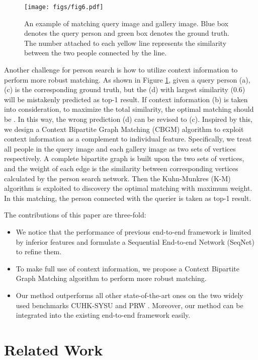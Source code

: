 \documentclass[letterpaper]{article} \usepackage{aaai21}  \usepackage{times}  \usepackage{helvet} \usepackage{courier}  \usepackage[hyphens]{url}  \usepackage{graphicx} \urlstyle{rm} \def\UrlFont{\rm}  \usepackage{natbib}  \usepackage{caption} \usepackage{multirow}
\begin{document}
\begin{figure}[t]
    \centering
    \texttt{[image: figs/fig6.pdf]}
    \caption{An example of matching query image and gallery image. Blue box denotes the query person and green box denotes the ground truth. The number attached to each yellow line represents the similarity between the two people connected by the line.}
    \label{matching_example}
\end{figure}

Another challenge for person search is how to utilize context information to perform more robust matching. As shown in Figure \ref{matching_example}, given a query person (a), (c) is the corresponding ground truth, but the (d) with largest similarity (0.6) will be mistakenly predicted as top-1 result. If context information (b) is taken into consideration, to maximize the total similarity, the optimal matching should be . In this way, the wrong prediction (d) can be revised to (c). Inspired by this, we design a Context Bipartite Graph Matching (CBGM) algorithm to exploit context information as a complement to individual feature. Specifically, we treat all people in the query image and each gallery image as two sets of vertices respectively. A complete bipartite graph is built upon the two sets of vertices, and the weight of each edge is the similarity between corresponding vertices calculated by the person search network. Then the Kuhn-Munkres (K-M) algorithm \cite{km-k,km-m} is exploited to discovery the optimal matching with maximum weight. In this matching, the person connected with the querier is taken as top-1 result.

The contributions of this paper are three-fold:

\begin{itemize}
    \item We notice that the performance of previous end-to-end framework is limited by inferior features and formulate a Sequential End-to-end Network (SeqNet) to refine them.
    \item To make full use of context information, we propose a Context Bipartite Graph Matching algorithm to perform more robust matching.
    \item Our method outperforms all other state-of-the-art ones on the two widely used benchmarks CUHK-SYSU \cite{oim} and PRW \cite{prw}. Moreover, our method can be integrated into the existing end-to-end framework easily.
\end{itemize}

\section{Related Work}
\end{document}
